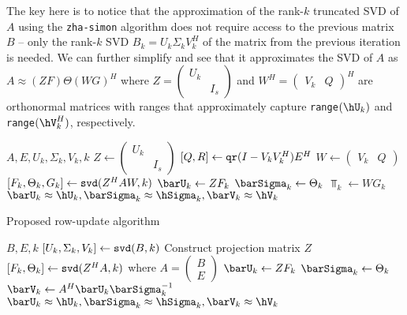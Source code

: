 The key here is to notice that the approximation of the rank-$k$ truncated SVD of $A$ using the \verb+zha-simon+ algorithm does not require access to the previous matrix $B$ -- only the rank-$k$ SVD $B_k=U_k \Sigma_k V_k^H$ of the matrix from the previous iteration is needed. We can further simplify  and see that it approximates the SVD of $A$ as $A \approx (ZF)\Theta(WG)^H$ where $Z=\begin{pmatrix} U_k & \\ & I_s \end{pmatrix}$ and $W^H=\begin{pmatrix} V_k & Q \end{pmatrix}^H$ are orthonormal matrices with ranges that approximately capture \verb+range+$(\hU_k)$ and \verb+range+$(\hV_k^H)$, respectively.

\begin{minipage}[t]{0.48\textwidth}
\begin{algorithm}[H]
    \centering
    \cprotect\caption{\verb|zha-simon| algorithm}\label{alg:orig_zha-simon}
    \begin{algorithmic}[1]
      \Require $A,E,U_k,\Sigma_k,V_k,k$
      \State $Z \gets \begin{pmatrix} U_k & \\ & I_s \end{pmatrix}$
      \State $[Q,R] \gets \verb|qr|(I-V_k V_k^H)E^H$ \label{op:zha-simon_qr}
      \State $W \gets \begin{pmatrix} V_k & Q \end{pmatrix}$
      \State $[F_k,\Theta_k,G_k] \gets \verb|svd|(Z^H AW,k)$ \label{op:zha-simon_svd}
      \State $\barU_k \gets Z F_k$
      \State $\barSigma_k \gets \Theta_k$
      \State $\barV_k \gets WG_k$
      \Ensure $\barU_k\approx\hU_k,\barSigma_k\approx\hSigma_k,\barV_k\approx\hV_k$
    \end{algorithmic}
\end{algorithm}
\end{minipage}
\hfill
\begin{minipage}[t]{0.48\textwidth}
\begin{algorithm}[H]
    \centering
    \caption{Proposed row-update algorithm} \label{alg:row-update}
    \begin{algorithmic}[1]
      \Require $B,E,k$
      \State $[U_k,\Sigma_k,V_k] \gets \verb|svd|(B,k)$
      \State Construct projection matrix $Z$
      \State $[F_k,\Theta_k] \gets \verb|svd|(Z^H A,k)$ where $A=\begin{pmatrix}B\\E\end{pmatrix}$ \label{op:row-update_svd}
      \State $\barU_k \gets Z F_k$
      \State $\barSigma_k \gets \Theta_k$
      \State $\barV_k \gets A^H \barU_k \barSigma_k^{-1}$
      \Ensure $\barU_k\approx\hU_k,\barSigma_k\approx\hSigma_k,\barV_k\approx\hV_k$
    \end{algorithmic}
\end{algorithm}
\end{minipage}

